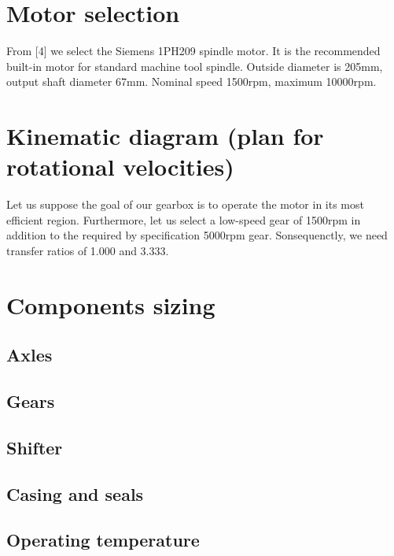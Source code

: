 \documentclass{article}
\begin{document}
\FPeval{}
\vExample

\section{Motor selection}
From [4] we select the Siemens 1PH209 spindle motor.
It is the recommended built-in motor for standard machine tool spindle.
Outside diameter is 205mm, output shaft diameter 67mm.
Nominal speed 1500rpm, maximum 10000rpm.

\section{Kinematic diagram (plan for rotational velocities)}
Let us suppose the goal of our gearbox is to operate the motor in its most efficient region.
Furthermore, let us select a low-speed gear of 1500rpm in addition to the required by specification 5000rpm gear.
Sonsequenctly, we need transfer ratios of 1.000 and 3.333.

\section{Components sizing}
\subsection{Axles}
\subsection{Gears}
\subsection{Shifter}
\subsection{Casing and seals}
\subsection{Operating temperature}
\end{document}
